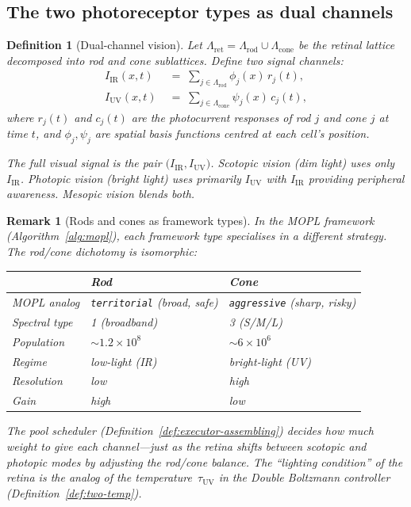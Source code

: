\documentclass[11pt,a4paper]{article}
\newtheorem{definition}[theorem]{Definition}
\newtheorem{remark}[theorem]{Remark}
\begin{document}
\subsection{The two photoreceptor types as dual channels}
\label{app:dual-channel}

\begin{definition}[Dual-channel vision]\label{def:dual-channel}
Let $\Lambda_{\mathrm{ret}} = \Lambda_{\mathrm{rod}} \cup
\Lambda_{\mathrm{cone}}$ be the retinal lattice decomposed
into rod and cone sublattices.
Define two signal channels:
\begin{align}
  I_{\mathrm{IR}}(x,t)
    &\;=\; \sum_{j \in \Lambda_{\mathrm{rod}}}
      \phi_j(x)\, r_j(t),
    \label{eq:ir-channel} \\
  I_{\mathrm{UV}}(x,t)
    &\;=\; \sum_{j \in \Lambda_{\mathrm{cone}}}
      \psi_j(x)\, c_j(t),
    \label{eq:uv-channel}
\end{align}
where $r_j(t)$ and $c_j(t)$ are the photocurrent responses
of rod $j$ and cone $j$ at time $t$, and $\phi_j, \psi_j$
are spatial basis functions centred at each cell's position.

The full visual signal is the pair
$\bigl(I_{\mathrm{IR}}, I_{\mathrm{UV}}\bigr)$.
Scotopic vision (dim light) uses only $I_{\mathrm{IR}}$.
Photopic vision (bright light) uses primarily
$I_{\mathrm{UV}}$ with $I_{\mathrm{IR}}$ providing
peripheral awareness.
Mesopic vision blends both.
\end{definition}

\begin{remark}[Rods and cones as framework types]%
\label{rem:rod-cone-framework}
In the MOPL framework (Algorithm~\ref{alg:mopl}),
each framework type specialises in a different strategy.
The rod/cone dichotomy is isomorphic:
\begin{center}
\small
\begin{tabular}{@{}lll@{}}
\toprule
& \textbf{Rod} & \textbf{Cone} \\
\midrule
MOPL analog & \texttt{territorial} (broad, safe) &
  \texttt{aggressive} (sharp, risky) \\
Spectral type & 1 (broadband) & 3 (S/M/L) \\
Population & $\sim 1.2 \times 10^8$ & $\sim 6 \times 10^6$ \\
Regime & low-light (IR) & bright-light (UV) \\
Resolution & low & high \\
Gain & high & low \\
\bottomrule
\end{tabular}
\end{center}
The pool scheduler
(Definition~\ref{def:executor-assembling})
decides how much weight to give each channel---just as
the retina shifts between scotopic and photopic modes
by adjusting the rod/cone balance.
The ``lighting condition'' of the retina is the
analog of the temperature~$\tau_{\mathrm{UV}}$
in the Double Boltzmann controller
(Definition~\ref{def:two-temp}).
\end{remark}
\end{document}
